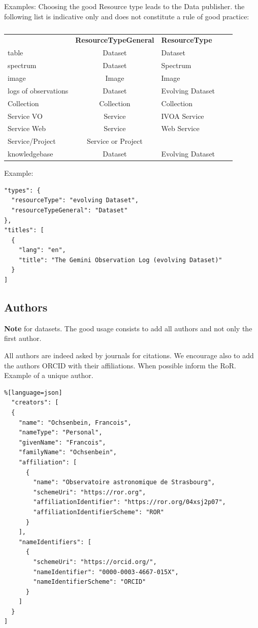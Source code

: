 \documentclass[11pt,a4paper]{ivoa}
\newcommand{\important}[1]{
	\begin{bigdescription}
		\item \color{ivoacolor}\textbf{Note} #1
	\end{bigdescription}
}
\begin{document}
Examples: Choosing the good Resource type leads to the Data publisher.
the following list is indicative only and does not constitute a rule of good practice:

\begin{table}[th]
\begin{tabular}{lclcr}
	\sptablerule
	 & \textbf{ResourceTypeGeneral} & \textbf{ResourceType}  \\
	\sptablerule
table         & Dataset             & Dataset          \\
spectrum      & Dataset             & Spectrum         \\
image         & Image               & Image            \\
logs of observations & Dataset      & Evolving Dataset \\
Collection    & Collection          & Collection       \\
Service VO    & Service             & IVOA Service     \\
Service Web   & Service             & Web Service      \\
Service/Project & Service or Project & \\
knowledgebase & Dataset             & Evolving Dataset \\  
\end{tabular}%
\caption{\label{tab:resourcetype}}
\end{table}

Example:

\begin{lstlisting}
"types": {
  "resourceType": "evolving Dataset",
  "resourceTypeGeneral": "Dataset"
},
"titles": [
  {
	"lang": "en",
	"title": "The Gemini Observation Log (evolving Dataset)"
  }
]
\end{lstlisting}

\subsection{Authors}\label{sec:authors}

\important{for datasets. The good usage consists to add all authors and not only the first author. }


All authors are indeed asked by journals for citations.
We encourage also to add the authors ORCID with their affiliations. When possible inform the RoR.\\

Example of a unique author.

\begin{lstlisting}%[language=json]
  "creators": [
  {
    "name": "Ochsenbein, Francois",
    "nameType": "Personal",
    "givenName": "Francois",
    "familyName": "Ochsenbein",
    "affiliation": [
      {
        "name": "Observatoire astronomique de Strasbourg",
        "schemeUri": "https://ror.org",
        "affiliationIdentifier": "https://ror.org/04xsj2p07",
        "affiliationIdentifierScheme": "ROR"
      }
    ],
    "nameIdentifiers": [
      {
        "schemeUri": "https://orcid.org/",
        "nameIdentifier": "0000-0003-4667-015X",
        "nameIdentifierScheme": "ORCID"
      }
    ]
  }
]
\end{lstlisting}
\end{document}
